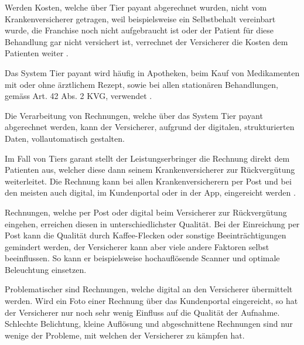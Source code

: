\documentclass{hwz}
\begin{document}
Werden Kosten, welche über Tier payant abgerechnet wurden, nicht vom Krankenversicherer getragen, weil beispielsweise ein Selbstbehalt vereinbart wurde, die Franchise noch nicht aufgebraucht ist oder der Patient für diese Behandlung gar nicht versichert ist, verrechnet der Versicherer die Kosten dem Patienten weiter \autocite{EidgenossischesDepartementdesInnern2017FaktenblattVergutungssysteme}.

Das System Tier payant wird häufig in Apotheken, beim Kauf von Medikamenten mit oder ohne ärztlichem Rezept, sowie bei allen stationären Behandlungen, gemäss Art. 42 Abs. 2 KVG, verwendet \autocite{EidgenossischesDepartementdesInnern2017FaktenblattVergutungssysteme}.

Die Verarbeitung von Rechnungen, welche über das System Tier payant abgerechnet werden, kann der Versicherer, aufgrund der digitalen, strukturierten Daten, vollautomatisch gestalten.

Im Fall von Tiers garant stellt der Leistungserbringer die Rechnung direkt dem Patienten aus, welcher diese dann seinem Krankenversicherer zur Rückvergütung weiterleitet. Die Rechnung kann bei allen Krankenversicherern per Post und bei den meisten auch digital, im Kundenportal oder in der App, eingereicht werden \autocite{EidgenossischesDepartementdesInnern2017FaktenblattVergutungssysteme}.

Rechnungen, welche per Post oder digital beim Versicherer zur Rückvergütung eingehen, erreichen diesen in unterschiedlichster Qualität. Bei der Einreichung per Post kann die Qualität durch Kaffee-Flecken oder sonstige Beeinträchtigungen gemindert werden, der Versicherer kann aber viele andere Faktoren selbst beeinflussen. So kann er beispielsweise hochauflösende Scanner und optimale Beleuchtung einsetzen.


Problematischer sind Rechnungen, welche digital an den Versicherer übermittelt werden. Wird ein Foto einer Rechnung über das Kundenportal eingereicht, so hat der Versicherer nur noch sehr wenig Einfluss auf die Qualität der Aufnahme. Schlechte Belichtung, kleine Auflösung und abgeschnittene Rechnungen sind nur wenige der Probleme, mit welchen der Versicherer zu kämpfen hat.
\end{document}
